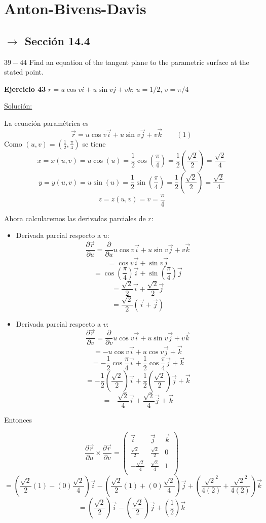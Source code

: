 \documentclass{report}
\date{}
\newcommand{\s}{\underline{Soluci\'{o}n:}}
\begin{document}
	
	\section*{Anton-Bivens-Davis}
	\subsection*{$\rightarrow$ Secci\'{o}n 14.4}
	
	$39-44$ Find an equation of the tangent plane to the parametric surface at the stated point. 
	
	\textbf{Ejercicio 43} $r = u\cos vi + u \sin vj + vk$; $u = 1/2$, $v = \pi/4$

	\s
	
	La ecuaci\'{o}n param\'{e}trica es 
	\[\vec{r} = u\cos v \vec{i} + u \sin v \vec{j} + v \vec{k} \qquad (1)\]
	Como $(u, v) = \left(\frac{1}{2}, \frac{\pi}{4} \right) $ se tiene 
	\[x = x(u, v) = u\cos(u) =\frac{1}{2}\cos\left(\frac{\pi}{4} \right) = \frac{1}{2}\left(\frac{\sqrt{2}}{2} \right) = \frac{\sqrt{2}}{4}   \]
	\[y = y(u, v) = u\sin(u) =\frac{1}{2}\sin\left(\frac{\pi}{4} \right) = \frac{1}{2}\left(\frac{\sqrt{2}}{2} \right) = \frac{\sqrt{2}}{4}\]
	\[z = z(u, v) = v = \frac{\pi}{4} \]
	
	Ahora calcularemos las derivadas parciales de $r$:
	\begin{itemize}
		\item Derivada parcial respecto a $u$:
		\[\frac{\partial \vec{r}}{\partial u} 
		  =\frac{\partial }{\partial u} u\cos v \vec{i} + u \sin v \vec{j} + v \vec{k} \]
		\[
		  = \cos v\vec{i} + \sin v \vec{j} \]
		\[= \cos\left( \frac{\pi}{4}\right)\vec{i}  + \sin \left( \frac{\pi}{4}\right) \vec{j} \]
		\[= \frac{\sqrt{2}}{2} \vec{i} + \frac{\sqrt{2}}{2} \vec{j}\]
		\[= \frac{\sqrt{2}}{2} \left(\vec{i} + \vec{ j}\right)  \]
		\item Derivada parcial respecto a $v$:
		\[\frac{\partial \vec{r}}{\partial v} 
		=\frac{\partial }{\partial v} u\cos v \vec{i} + u \sin v \vec{j} + v \vec{k} \]
		\[= -u\cos v\vec{i} + u\cos v\vec{j} + \vec{k}\]
		\[= -\frac{1}{2}\cos \frac{\pi}{4}\vec{i} + \frac{1}{2}\cos \frac{\pi}{4}\vec{j} + \vec{k}\]
		\[= -\frac{1}{2}\left(\frac{\sqrt{2}}{2}\right) \vec{i} + \frac{1}{2}\left( \frac{\sqrt{2}}{2}\right) \vec{j} + \vec{k}\]
		\[= -\frac{\sqrt{2}}{4} \vec{i} +  \frac{\sqrt{2}}{4} \vec{j} + \vec{k}\]
	\end{itemize}
	Entonces 
	
	\[\frac{\partial \vec{r}}{\partial u} \times \frac{\partial \vec{r}}{\partial v} = \left( \begin{array}{ccc}
	\vec{i} & \vec{j} & \vec{k} \\ 
	\frac{\sqrt{2}}{2} & \frac{\sqrt{2}}{2}& 0 \\
	-\frac{\sqrt{2}}{4}& \frac{\sqrt{2}}{4} & 1 \\
	\end{array} \right)\]
	\[ = \left( \frac{\sqrt{2}}{2}(1)- (0)\frac{\sqrt{2}}{4}\right) \vec{i} -  \left( \frac{\sqrt{2}}{2}(1)+ (0)\frac{\sqrt{2}}{4}\right) \vec{j} + \left( \frac{\sqrt{2}^2}{4(2)} + \frac{\sqrt{2}^2}{4(2)}\right) \vec{k}\]
	\[= \left( \frac{\sqrt{2}}{2}\right) \vec{i} -  \left( \frac{\sqrt{2}}{2}\right) \vec{j} + \left( \frac{1}{2}\right) \vec{k}\]
	
\end{document}
